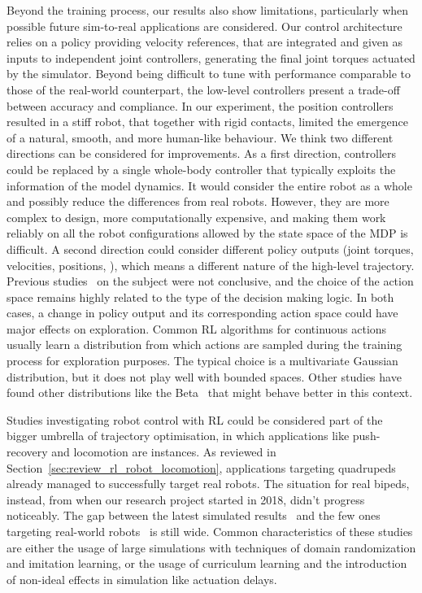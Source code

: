Beyond the training process, our results also show limitations, particularly when possible future sim-to-real applications are considered.
Our control architecture relies on a policy providing velocity references, that are integrated and given as inputs to independent \pid joint controllers, generating the final joint torques actuated by the simulator.
Beyond being difficult to tune with performance comparable to those of the real-world counterpart, the low-level \pid controllers present a trade-off between accuracy and compliance.
In our experiment, the position \pid controllers resulted in a stiff robot, that together with rigid contacts, limited the emergence of a natural, smooth, and more human-like behaviour.
We think two different directions can be considered for improvements.
As a first direction, \pid controllers could be replaced by a single whole-body controller that typically exploits the information of the model dynamics.
It would consider the entire robot as a whole and possibly reduce the differences from real robots.
However, they are more complex to design, more computationally expensive, and making them work reliably on all the robot configurations allowed by the state space of the \ac{MDP} is difficult.
A second direction could consider different policy outputs (joint torques, velocities, positions, \etc), which means a different nature of the high-level trajectory.
Previous studies~\parencite{peng_learning_2017,reda_learning_2020} on the subject were not conclusive, and the choice of the action space remains highly related to the type of the decision making logic.
In both cases, a change in policy output and its corresponding action space could have major effects on exploration.
Common \ac{RL} algorithms for continuous actions usually learn a distribution from which actions are sampled during the training process for exploration purposes.
The typical choice is a multivariate Gaussian distribution, but it does not play well with bounded spaces.
Other studies have found other distributions like the Beta~\parencite{chou_improving_2017} that might behave better in this context.

Studies investigating robot control with \ac{RL} could be considered part of the bigger umbrella of trajectory optimisation, in which applications like push-recovery and locomotion are instances.
As reviewed in Section~\ref{sec:review_rl_robot_locomotion}, applications targeting quadrupeds already managed to successfully target real robots.
The situation for real bipeds, instead, from when our research project started in 2018, didn't progress noticeably.
The gap between the latest simulated results~\parencite{peng_ase_2022} and the few ones targeting real-world robots~\parencite{castillo_robust_2021,li_reinforcement_2021,rodriguez_deepwalk_2021,bloesch_towards_2022} is still wide.
Common characteristics of these studies are either the usage of large simulations with techniques of domain randomization and imitation learning, or the usage of curriculum learning and the introduction of non-ideal effects in simulation like actuation delays.

